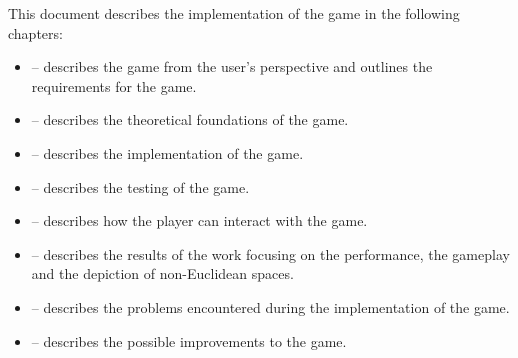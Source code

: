 This document describes the implementation of the game in the following chapters:
\begin{itemize}
    \item {} -- describes the game from the user's perspective and outlines the requirements for the game.
    \item {} -- describes the theoretical foundations of the game.
    \item {} -- describes the implementation of the game.
    \item {} -- describes the testing of the game.
    \item {} -- describes how the player can interact with the game.
    \item {} -- describes the results of the work focusing on the performance, the gameplay and the depiction of non-Euclidean spaces.
    \item {} -- describes the problems encountered during the implementation of the game.
    \item {} -- describes the possible improvements to the game.
\end{itemize}


